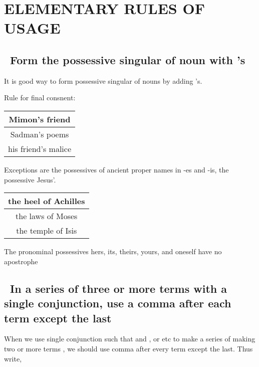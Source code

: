 \documentclass[10pt]{report}
\begin{document}
\chapter {ELEMENTARY RULES OF USAGE}

\section {\bfseries \ Form the possessive singular of noun with ’s}\label{sec:one}

It is good way to form possessive singular of nouns by adding ’s.

Rule for final consnent:

\begin{table}[!tbh]
    \centering
        \begin{tabular}{|c|}
        \hline
        Mimon’s friend\\
        \hline
        Sadman’s poems\\
        \hline
        his friend’s malice\\   
        \hline
        \end{tabular}
    
\end{table}
\noindent
Exceptions are the possessives of ancient proper names in -es and -is, the possessive
Jesus’.

\begin{table}[!tbh]
    \centering
        \begin{tabular}{|c|}
        \hline
        the heel of Achilles\\
        \hline
		the laws of Moses\\
		\hline
		the temple of Isis\\
		\hline
        \end{tabular}
    
\end{table}

\noindent
The pronominal possessives hers, its, theirs, yours, and oneself have no apostrophe

\pagebreak

\section {\bfseries \ In a series of three or more terms with a single conjunction, use a
comma after each term except the last}\label{sec:two}

When we use single conjunction such that and , or etc to make a series of making
two or more terms , we should use comma after every term except the last.
Thus write,\\
\end{document}
